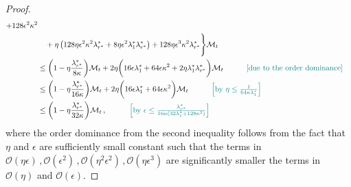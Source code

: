 \begin{proof}
\begin{align*}
         + 128 \epsilon^2\kappa^2\\
         & \quad +\eta\left(128\eta\epsilon^2\kappa^2\lambda_{r^*}^*+8\eta\epsilon^2\lambda_1^*\lambda_{r^*}^*\right)+128\eta\epsilon^3\kappa^2\lambda_{r^*}^*\Bigg\}\mathcal{M}_t\\
         & \leq \bigg(1-\eta \frac{\lambda^*_{r^*}}{8\kappa}\bigg)\mathcal{M}_t
        + 2\eta\bigg(16\epsilon \lambda_1^*+64\epsilon \kappa^2+2\eta \lambda_1^*\lambda_{r^*}^*
         \bigg)\mathcal{M}_t \quad \tag*{\color{teal}[due to the order dominance]}\\
         & \leq \bigg(1-\eta \frac{\lambda^*_{r^*}}{16\kappa}\bigg)\mathcal{M}_t
        + 2\eta\bigg(16\epsilon \lambda_1^*+64\epsilon \kappa^2
         \bigg)\mathcal{M}_t\quad \tag*{\color{teal}$\left[\text{by }\eta \leq \frac{1}{64\kappa\lambda_1^*}\right]$}\\
         & \leq \bigg(1-\eta \frac{\lambda^*_{r^*}}{32\kappa}\bigg)\mathcal{M}_t\,,\quad \tag*{\color{teal}$\left[\text{by }\epsilon \leq \frac{\lambda^*_{r^*}}{16\kappa(32 \lambda_1^*+128 \kappa^2)}\right]$}
    \end{align*}
   where the order dominance from the second inequality follows from the fact that $\eta$ and $\epsilon$ are sufficiently small constant such that the terms in $\mathcal{O}(\eta \epsilon)\,,\mathcal{O}(\epsilon^2)\,,\mathcal{O}(\eta^2\epsilon^2)\,,\mathcal{O}(\eta \epsilon^3)$ are significantly smaller the terms in $\mathcal{O}(\eta)$ and $\mathcal{O}(\epsilon)$.
    

\end{proof}
